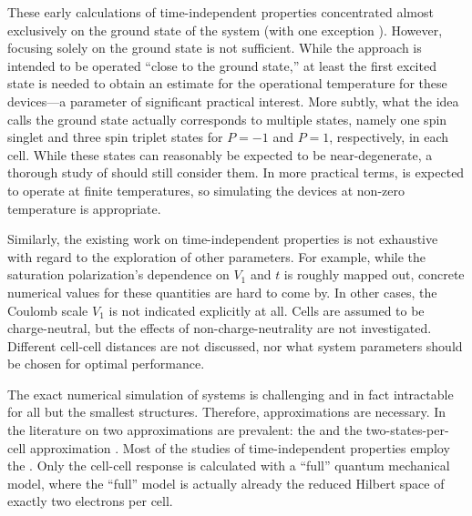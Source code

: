 These early calculations of time-independent  properties concentrated
almost exclusively on the ground state of the system (with one exception
\cite{tougaw1993bistable}). However, focusing solely on the ground state is not
sufficient. While the  approach is intended to be operated ``close to
the ground state,'' at least the first excited state is needed to obtain an
estimate for the operational temperature for these devices---a parameter of
significant practical interest. More subtly, what the  idea calls the
ground state actually corresponds to multiple states, namely one spin singlet
and three spin triplet states for $P=-1$ and $P=1$, respectively, in each cell.
While these states can reasonably be expected to be near-degenerate, a thorough
study of  should still consider them. In more practical terms,
 is expected to operate at finite temperatures, so simulating the
devices at non-zero temperature is appropriate. 

%
Similarly, the existing work on time-independent  properties is not
exhaustive with regard to the exploration of other parameters. For example,
while the saturation polarization's dependence on $V_1$ and $t$ is roughly
mapped out, concrete numerical values for these quantities are hard to come by.
In other cases, the Coulomb scale $V_1$ is not indicated explicitly at all.
Cells are assumed to be charge-neutral, but the effects of non-charge-neutrality
are not investigated. Different cell-cell distances are not discussed, nor what
system parameters should be chosen for optimal performance.

The exact numerical simulation of  systems is challenging and in fact
intractable for all but the smallest structures. Therefore, approximations are
necessary. In the literature on  two approximations are prevalent: the
 and the two-states-per-cell approximation \cite{lent1993quantum}
\cite{tougaw1996dynamic}. Most of the studies of time-independent 
properties employ the . Only the cell-cell response is calculated
with a ``full'' quantum mechanical model, where the ``full'' model is actually
already the reduced Hilbert space of exactly two electrons per cell. 

